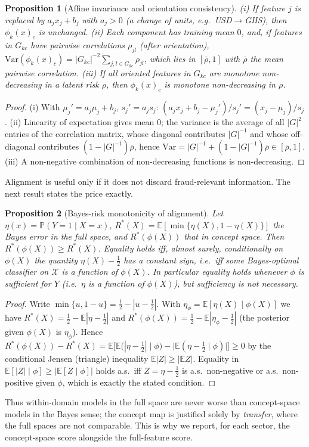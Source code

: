 \documentclass[journal]{IEEEtran}
\newtheorem{proposition}{Proposition}
\newcommand{\E}{\mathbb{E}}
\newcommand{\Prob}{\mathbb{P}}
\newcommand{\1}{\mathbf{1}}
\newcommand{\Xspace}{\mathcal{X}}
\begin{document}
\begin{proposition}[Affine invariance and orientation consistency]\label{prop:align}
(i) If feature $j$ is replaced by $a_jx_j+b_j$ with $a_j>0$ (a change of units, e.g.\ USD$\to$GHS), then $\phi_k(x)_c$ is unchanged. (ii) Each component has training mean $0$, and, if features in $G_{kc}$ have pairwise correlations $\rho_{jl}$ (after orientation), $\mathrm{Var}(\phi_k(x)_c)=|G_{kc}|^{-2}\sum_{j,l\in G_{kc}}\rho_{jl}$, which lies in $[\bar\rho,1]$ with $\bar\rho$ the mean pairwise correlation. (iii) If all oriented features in $G_{kc}$ are monotone non-decreasing in a latent risk $\rho$, then $\phi_k(x)_c$ is monotone non-decreasing in $\rho$.
\end{proposition}
\begin{proof}
(i) With $\mu_j'=a_j\mu_j+b_j$, $s_j'=a_js_j$: $(a_jx_j+b_j-\mu_j')/s_j'=(x_j-\mu_j)/s_j$. (ii) Linearity of expectation gives mean $0$; the variance is the average of all $|G|^2$ entries of the correlation matrix, whose diagonal contributes $|G|^{-1}$ and whose off-diagonal contributes $(1-|G|^{-1})\bar\rho$, hence $\mathrm{Var}=|G|^{-1}+(1-|G|^{-1})\bar\rho\in[\bar\rho,1]$. (iii) A non-negative combination of non-decreasing functions is non-decreasing. \end{proof}

Alignment is useful only if it does not discard fraud-relevant information. The next result states the price exactly.

\begin{proposition}[Bayes-risk monotonicity of alignment]\label{prop:bayes}
Let $\eta(x)=\Prob(Y{=}1\mid X{=}x)$, $R^\ast(X)=\E[\min\{\eta(X),1-\eta(X)\}]$ the Bayes error in the full space, and $R^\ast(\phi(X))$ that in concept space. Then $R^\ast(\phi(X))\ge R^\ast(X)$. Equality holds iff, almost surely, conditionally on $\phi(X)$ the quantity $\eta(X)-\tfrac12$ has a constant sign, i.e.\ iff some Bayes-optimal classifier on $\Xspace$ is a function of $\phi(X)$. In particular equality holds whenever $\phi$ is sufficient for $Y$ (i.e.\ $\eta$ is a function of $\phi(X)$), but sufficiency is not necessary.
\end{proposition}
\begin{proof}
Write $\min\{u,1-u\}=\tfrac12-|u-\tfrac12|$. With $\eta_\phi=\E[\eta(X)\mid\phi(X)]$ we have $R^\ast(X)=\tfrac12-\E|\eta-\tfrac12|$ and $R^\ast(\phi(X))=\tfrac12-\E|\eta_\phi-\tfrac12|$ (the posterior given $\phi(X)$ is $\eta_\phi$). Hence $R^\ast(\phi(X))-R^\ast(X)=\E\big[\E\big(|\eta-\tfrac12|\mid\phi\big)-\big|\E(\eta-\tfrac12\mid\phi)\big|\big]\ge0$ by the conditional Jensen (triangle) inequality $\E|Z|\ge|\E Z|$. Equality in $\E[|Z|\mid\phi]\ge|\E[Z\mid\phi]|$ holds a.s.\ iff $Z=\eta-\tfrac12$ is a.s.\ non-negative or a.s.\ non-positive given $\phi$, which is exactly the stated condition. \end{proof}
\noindent Thus within-domain models in the full space are never worse than concept-space models in the Bayes sense; the concept map is justified solely by \emph{transfer}, where the full spaces are not comparable. This is why we report, for each sector, the concept-space score alongside the full-feature score.
\end{document}
